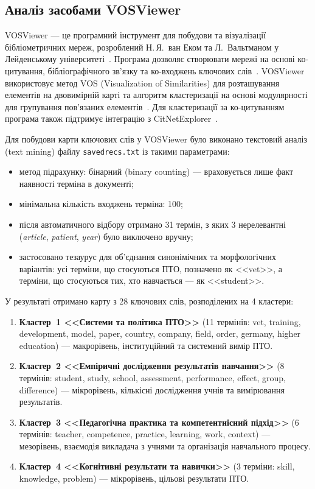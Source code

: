 \subsection{Аналіз засобами VOSViewer}
\label{sec:vosviewer}

VOSViewer --- це програмний інструмент для побудови та візуалізації бібліометричних мереж, розроблений Н.\,Я.~ван Еком та Л.~Вальтманом у Лейденському університеті~\cite{vanEck2010}. Програма дозволяє створювати мережі на основі ко-цитування, бібліографічного зв'язку та ко-входжень ключових слів~\cite{vanEck2014}. VOSViewer використовує метод VOS (Visualization of Similarities) для розташування елементів на двовимірній карті та алгоритм кластеризації на основі модулярності для групування пов'язаних елементів~\cite{Waltman2010}. Для кластеризації за ко-цитуванням програма також підтримує інтеграцію з CitNetExplorer~\cite{vanEck2017}.

Для побудови карти ключових слів у VOSViewer було виконано текстовий аналіз (text mining) файлу \texttt{savedrecs.txt} із такими параметрами:
\begin{itemize}
    \item метод підрахунку: бінарний (binary counting) --- враховується лише факт наявності терміна в документі;
    \item мінімальна кількість входжень терміна: 100;
    \item після автоматичного відбору отримано 31 термін, з яких 3 нерелевантні (\textit{article}, \textit{patient}, \textit{year}) було виключено вручну;
    \item застосовано тезаурус для об'єднання синонімічних та морфологічних варіантів: усі терміни, що стосуються ПТО, позначено як <<vet>>, а терміни, що стосуються тих, хто навчається --- як <<student>>.
\end{itemize}

У результаті отримано карту з 28 ключових слів, розподілених на 4 кластери:

\begin{enumerate}
    \item \textbf{Кластер~1 <<Системи та політика ПТО>>} (11 термінів: vet, training, development, model, paper, country, company, field, order, germany, higher education) --- макрорівень, інституційний та системний вимір ПТО.
    \item \textbf{Кластер~2 <<Емпіричні дослідження результатів навчання>>} (8 термінів: student, study, school, assessment, performance, effect, group, difference) --- мікрорівень, кількісні дослідження учнів та вимірювання результатів.
    \item \textbf{Кластер~3 <<Педагогічна практика та компетентнісний підхід>>} (6 термінів: teacher, competence, practice, learning, work, context) --- мезорівень, взаємодія викладача з учнями та організація навчального процесу.
    \item \textbf{Кластер~4 <<Когнітивні результати та навички>>} (3 терміни: skill, knowledge, problem) --- мікрорівень, цільові результати ПТО.
\end{enumerate}

